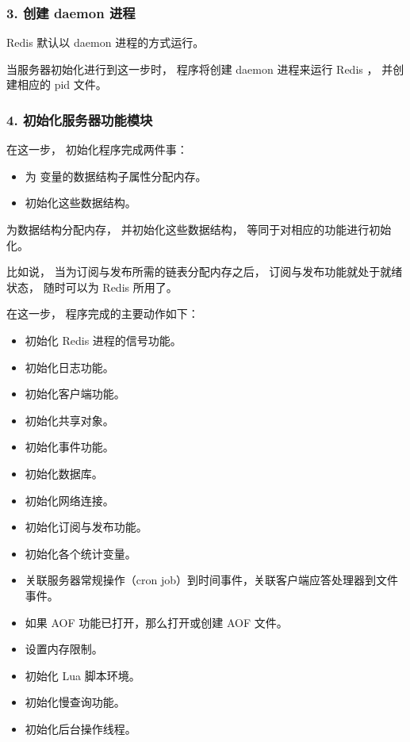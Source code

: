 \documentclass[a4paper,11pt,english]{sphinxmanual}
\begin{document}
\subsubsection{3. 创建 daemon 进程}
\label{internal/redis:daemon}
Redis 默认以 daemon 进程的方式运行。

当服务器初始化进行到这一步时，
程序将创建 daemon 进程来运行 Redis ，
并创建相应的 pid 文件。


\subsubsection{4. 初始化服务器功能模块}
\label{internal/redis:id5}
在这一步，
初始化程序完成两件事：
\begin{itemize}
\item {} 
为  变量的数据结构子属性分配内存。

\item {} 
初始化这些数据结构。

\end{itemize}

为数据结构分配内存，
并初始化这些数据结构，
等同于对相应的功能进行初始化。

比如说，
当为订阅与发布所需的链表分配内存之后，
订阅与发布功能就处于就绪状态，
随时可以为 Redis 所用了。

在这一步，
程序完成的主要动作如下：
\begin{itemize}
\item {} 
初始化 Redis 进程的信号功能。

\item {} 
初始化日志功能。

\item {} 
初始化客户端功能。

\item {} 
初始化共享对象。

\item {} 
初始化事件功能。

\item {} 
初始化数据库。

\item {} 
初始化网络连接。

\item {} 
初始化订阅与发布功能。

\item {} 
初始化各个统计变量。

\item {} 
关联服务器常规操作（cron job）到时间事件，关联客户端应答处理器到文件事件。

\item {} 
如果 AOF 功能已打开，那么打开或创建 AOF 文件。

\item {} 
设置内存限制。

\item {} 
初始化 Lua 脚本环境。

\item {} 
初始化慢查询功能。

\item {} 
初始化后台操作线程。

\end{itemize}
\end{document}
